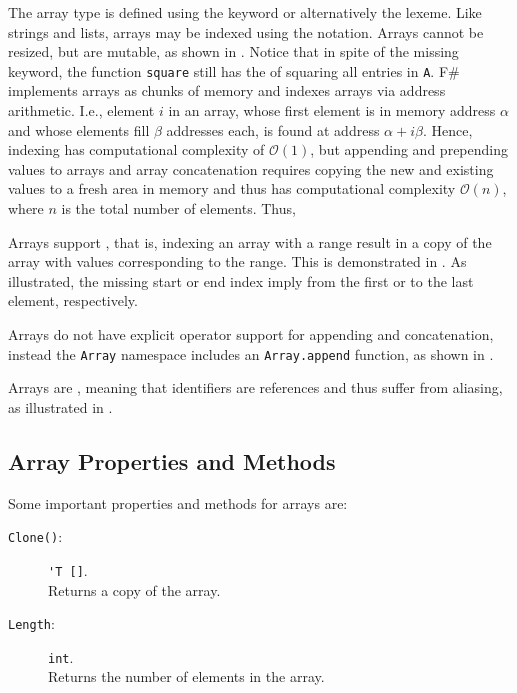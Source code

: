 \documentclass[springer.tex]{subfiles}
\begin{document}
The array type is defined using the  keyword or alternatively the \lexeme{[]} lexeme.  Like strings and lists, arrays may be indexed using the  notation. Arrays cannot be resized, but are mutable, as shown in .
%
%
Notice that in spite of the missing  keyword, the function \lstinline{square} still has the  of squaring all entries in \lstinline{A}.  F\# implements arrays as chunks of memory and indexes arrays via address arithmetic. I.e., element $i$ in an array, whose first element is in memory address $\alpha$ and whose elements fill $\beta$ addresses each, is found at address $\alpha+i\beta$. Hence, indexing has computational complexity of $\mathcal{O}(1)$, but appending and prepending values to arrays and array concatenation requires copying the new and existing values to a fresh area in memory and thus has computational complexity $\mathcal{O}(n)$, where $n$ is the total number of elements. Thus, 

Arrays support , that is, indexing an array with a range result in a copy of the array with values corresponding to the range. This is demonstrated in .
%
%
As illustrated, the missing start or end index imply from the first or to the last element, respectively.

Arrays do not have explicit operator support for appending and concatenation, instead the \lstinline{Array} namespace includes an \lstinline{Array.append} function, as shown in .
%
%

Arrays are , meaning that identifiers are references and thus suffer from aliasing, as illustrated in .
%
%
\clearpage

\subsection{Array Properties and Methods}
\label{sec:arrayMethods}
Some important properties and methods for arrays are:
\begin{description}
\item[\texttt{Clone()}:] \lstinline{'T []}.~\\
  Returns a copy of the array.
\item[\texttt{Length}:] \lstinline{int}.~\\
  Returns the number of elements in the array.
\end{description}
\end{document}
